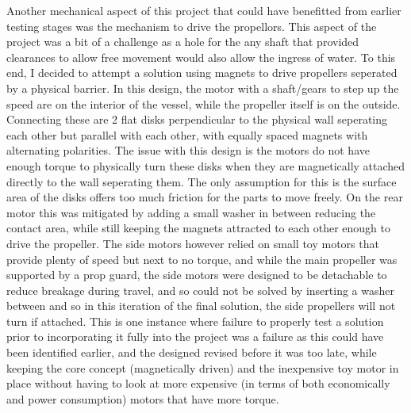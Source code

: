\documentclass[11pt,a4paper,titlepage]{report}
\begin{document}
	Another mechanical aspect of this project that could have benefitted from earlier testing stages was the mechanism to drive the propellors. This aspect of the project was a bit of a challenge as a hole for the any shaft that provided clearances to allow free movement would also allow the ingress of water. To this end, I decided to attempt a solution using magnets to drive propellers seperated by a physical barrier. In this design, the motor with a shaft/gears to step up the speed are on the interior of the vessel, while the propeller itself is on the outside. Connecting these are 2 flat disks perpendicular to the physical wall seperating each other but parallel with each other, with equally spaced magnets with alternating polarities. The issue with this design is the motors do not have enough torque to physically turn these disks when they are magnetically attached directly to the wall seperating them. The only assumption for this is the surface area of the disks offers too much friction for the parts to move freely. On the rear motor this was mitigated by adding a small washer in between reducing the contact area, while still keeping the magnets attracted to each other enough to drive the propeller. The side motors however relied on small toy motors that provide plenty of speed but next to no torque, and while the main propeller was supported by a prop guard, the side motors were designed to be detachable to reduce breakage during travel, and so could not be solved by inserting a washer between and so in this iteration of the final solution, the side propellers will not turn if attached. This is one instance where failure to properly test a solution prior to incorporating it fully into the project was a failure as this could have been identified earlier, and the designed revised before it was too late, while keeping the core concept (magnetically driven) and the inexpensive toy motor in place without having to look at more expensive (in terms of both economically and power consumption) motors that have more torque. 
	
\end{document}
